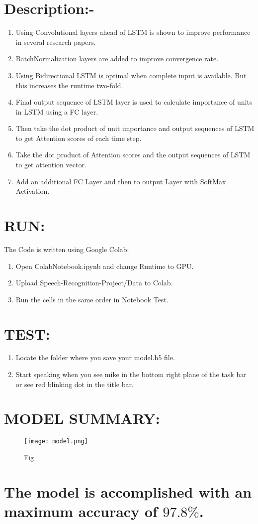 \documentclass[a4paper,12pt]{article}
\begin{document}
\section{Description:-}
\begin{enumerate}
	\item Using Convolutional layers ahead of LSTM is shown to improve performance in several research papers.
	\item BatchNormalization layers are added to improve convergence rate.
	\item Using Bidirectional LSTM is optimal when complete input is available. But this increases the runtime two-fold.
	\item Final output sequence of LSTM layer is used to calculate importance of units in LSTM using a FC layer.
	\item Then take the dot product of unit importance and output sequences of LSTM to get Attention scores of each time step.
	\item Take the dot product of Attention scores and the output sequences of LSTM to get attention vector.
	\item Add an additional FC Layer and then to output Layer with SoftMax Activation.
	
\end{enumerate}
\section{RUN:}
The Code is written using Google Colab:
\begin{enumerate}
	\item  Open ColabNotebook.ipynb and change Runtime to GPU.
	\item  Upload Speech-Recognition-Project/Data to Colab.
	\item Run the cells in the same order in Notebook Test.
\end{enumerate}
\section{TEST:}
\begin{enumerate}
	\item  Locate the folder where you save your model.h5 file.
	\item  Start speaking when you see mike in the bottom right plane of the task bar
	or see red blinking dot in the title bar.
\end{enumerate}
\section{MODEL SUMMARY:}
\begin{figure}[htp]
	\centering
	\texttt{[image: model.png]}
	\caption{Fig}
\end{figure}
\newpage
\section{The model is accomplished with an maximum accuracy of $97.8\%$.}
\end{document}
